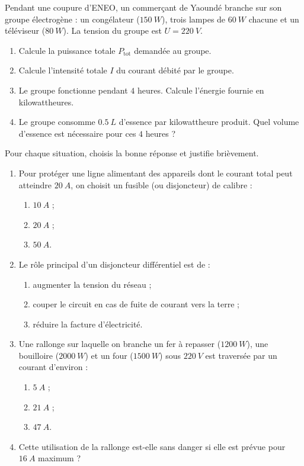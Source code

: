 \documentclass[11pt]{article}
\begin{document}
\begin{exercice}
Pendant une coupure d'ENEO, un commerçant de Yaoundé branche sur son groupe électrogène : un congélateur ($\SI{150}{W}$), trois lampes de $\SI{60}{W}$ chacune et un téléviseur ($\SI{80}{W}$). La tension du groupe est $U = \SI{220}{V}$.
\begin{enumerate}
\item Calcule la puissance totale $P_{\text{tot}}$ demandée au groupe.
\item Calcule l'intensité totale $I$ du courant débité par le groupe.
\item Le groupe fonctionne pendant $4$ heures. Calcule l'énergie fournie en kilowattheures.
\item Le groupe consomme $\SI{0,5}{L}$ d'essence par kilowattheure produit. Quel volume d'essence est nécessaire pour ces $4$ heures ?
\end{enumerate}
\end{exercice}

\begin{exercice}
Pour chaque situation, choisis la bonne réponse et justifie brièvement.
\begin{enumerate}
\item Pour protéger une ligne alimentant des appareils dont le courant total peut atteindre $\SI{20}{A}$, on choisit un fusible (ou disjoncteur) de calibre :
\begin{enumerate}
\item $\SI{10}{A}$ ; \item $\SI{20}{A}$ ; \item $\SI{50}{A}$.
\end{enumerate}
\item Le rôle principal d'un disjoncteur différentiel est de :
\begin{enumerate}
\item augmenter la tension du réseau ;
\item couper le circuit en cas de fuite de courant vers la terre ;
\item réduire la facture d'électricité.
\end{enumerate}
\item Une rallonge sur laquelle on branche un fer à repasser ($\SI{1200}{W}$), une bouilloire ($\SI{2000}{W}$) et un four ($\SI{1500}{W}$) sous $\SI{220}{V}$ est traversée par un courant d'environ :
\begin{enumerate}
\item $\SI{5}{A}$ ; \item $\SI{21}{A}$ ; \item $\SI{47}{A}$.
\end{enumerate}
\item Cette utilisation de la rallonge est-elle sans danger si elle est prévue pour $\SI{16}{A}$ maximum ?
\end{enumerate}
\end{exercice}
\end{document}
